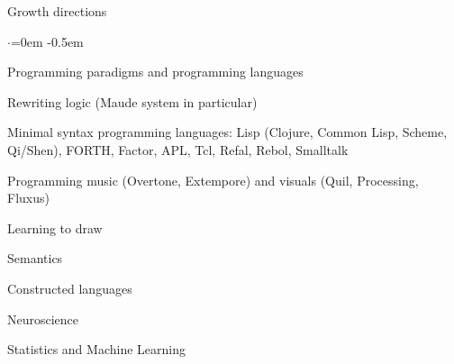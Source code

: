 \documentclass{resume} %
\begin{document}

\begin{rSection}{Growth directions}
  \smallskip
  \begin{list}{$\cdot$}{\leftmargin=0em} %
    \itemsep -0.5em \vspace{-0.5em} %
  \item Programming paradigms and programming languages
  \item Rewriting logic (Maude system in particular)
  \item Minimal syntax programming languages: Lisp (Clojure, Common Lisp, Scheme,
        Qi/Shen), FORTH, Factor, APL, Tcl, Refal, Rebol, Smalltalk
  \item Programming music (Overtone, Extempore) and visuals (Quil, Processing, Fluxus)
  \item Learning to draw
  \item Semantics
  \item Constructed languages
  \item Neuroscience
  \item Statistics and Machine Learning
  \end{list}
\end{rSection}

\end{document}
